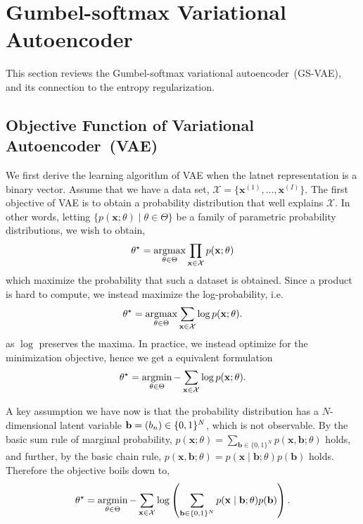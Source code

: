 \documentclass[10pt,letterpaper]{article}
\newcommand{\argmin}{\mathop{\rm argmin}}
\newcommand{\argmax}{\mathop{\rm argmax}}
\begin{document}
\section{Gumbel-softmax Variational Autoencoder}
\label{gumbel-sofmax-theory}
This section reviews the Gumbel-softmax variational autoencoder~(GS-VAE), and its connection to the entropy regularization.

\subsection{Objective Function of Variational Autoencoder~(VAE)}
We first derive the learning algorithm of VAE when the latnet representation is a binary vector.
Assume that we have a data set, $\mathcal{X}=\{\mathbf{x}^{(1)},\dots,\mathbf{x}^{(I)}\}$.
The first objective of VAE is to obtain a probability distribution that well explains $\mathcal{X}$.
In other words, letting $\{p(\mathbf{x};\theta) \mid \theta\in\Theta\}$ be a family of parametric probability distributions, we wish to obtain,
\begin{align*}
\theta^\star = \argmax_{\theta\in\Theta} \prod_{\mathbf{x}\in \mathcal{X}} p(\mathbf{x};\theta)
\end{align*}
which maximize the probability that such a dataset is obtained. Since a product is hard to compute, we instead maximize the log-probability, i.e.
\begin{align*}
\theta^\star = \argmax_{\theta\in\Theta} \sum_{\mathbf{x}\in \mathcal{X}} \log p(\mathbf{x};\theta).
\end{align*}
as $\log$ preserves the maxima.
In practice, we instead optimize for the minimization objective, hence we get a equivalent formulation
\begin{align*}
\theta^\star = \argmin_{\theta\in\Theta} - \sum_{\mathbf{x}\in \mathcal{X}} \log p(\mathbf{x};\theta).
\end{align*}


A key assumption we have now is that the probability distribution has a $N$-dimensional latent variable $\mathbf{b}={\left(b_n\right)}\in\{0,1\}^N$, which is not observable.
By the basic sum rule of marginal probability,
$p(\mathbf{x};\theta) = \sum_{\mathbf{b}\in\{0,1\}^N}p(\mathbf{x}, \mathbf{b};\theta)$ holds, and further,
by the basic chain rule,
$p(\mathbf{x}, \mathbf{b};\theta) = p(\mathbf{x} \mid \mathbf{b};\theta)p(\mathbf{b})$ holds.
Therefore the objective boils down to,
\begin{align}
\label{eq:vae-obj} \theta^\star = \argmin_{\theta\in\Theta} -\sum_{\mathbf{x}\in \mathcal{X}} \log \left(\sum_{\mathbf{b}\in\{0,1\}^N}p(\mathbf{x} \mid \mathbf{b};\theta)p(\mathbf{b})\right).
\end{align}
\end{document}
